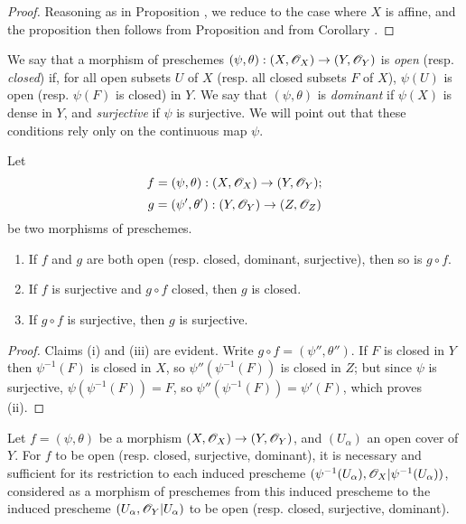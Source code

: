 \begin{proof}
\label{proof-1.2.2.5}
Reasoning as in Proposition , we reduce to the case where $X$ is
affine, and the proposition then follows from Proposition 
and from Corollary .
\end{proof}

\begin{env}[2.2.6]
\label{1.2.2.6}
We say that a morphism of preschemes
$(\psi,\theta):(X,\mathscr{O}_X)\to(Y,\mathscr{O}_Y)$ is {\em open} (resp. {\em closed})
if, for all open subsets $U$ of $X$ (resp. all closed subsets $F$ of $X$),
$\psi(U)$ is open (resp. $\psi(F)$ is closed) in $Y$. We say that
$(\psi,\theta)$ is {\em dominant} if $\psi(X)$ is dense in $Y$, and
{\em surjective} if $\psi$ is surjective. We will point out that these
conditions rely only on the continuous map $\psi$.
\end{env}

\begin{prop}[2.2.7]
\label{1.2.2.7}
Let
\[
  f=(\psi,\theta):(X,\mathscr{O}_X)\to(Y,\mathscr{O}_Y);
\]
\[
  g=(\psi',\theta'):(Y,\mathscr{O}_Y)\to(Z,\mathscr{O}_Z)
\]
be two morphisms of preschemes.
\begin{enumerate}[label=\emph{(\roman*)}]
  \item If $f$ and $g$ are both open (resp. closed, dominant, surjective),
    then so is $g\circ f$.
  \item If $f$ is surjective and $g\circ f$ closed, then $g$ is closed.
  \item If $g\circ f$ is surjective, then $g$ is surjective.
\end{enumerate}
\end{prop}

\begin{proof}
\label{proof-1.2.2.7}
Claims (i) and (iii) are evident. Write $g\circ f=(\psi'',\theta'')$.
If $F$ is closed in $Y$ then $\psi^{-1}(F)$ is closed in $X$, so
$\psi''(\psi^{-1}(F))$ is closed in $Z$; but since $\psi$ is surjective,
$\psi(\psi^{-1}(F))=F$, so $\psi''(\psi^{-1}(F))=\psi'(F)$, which proves (ii).
\end{proof}

\begin{prop}[2.2.8]
\label{1.2.2.8}
Let $f=(\psi,\theta)$ be a morphism
$(X,\mathscr{O}_X)\to(Y,\mathscr{O}_Y)$, and $(U_\alpha)$ an open cover of $Y$. For $f$ to be
open (resp. closed, surjective, dominant), it is necessary and sufficient for
its restriction to each induced prescheme
$(\psi^{-1}(U_\alpha),\mathscr{O}_X|\psi^{-1}(U_\alpha))$, considered as a morphism of
preschemes from this induced prescheme to the induced prescheme
$(U_\alpha,\mathscr{O}_Y|U_\alpha)$ to be open (resp. closed, surjective, dominant).
\end{prop}

